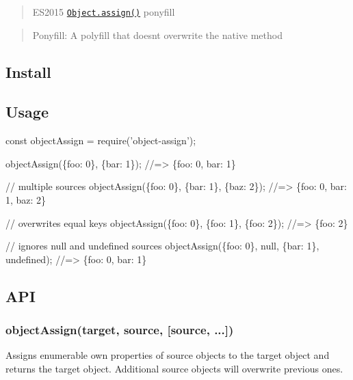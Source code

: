 \begin{quote}
E\+S2015 \href{http://www.2ality.com/2014/01/object-assign.html}{\tt {\ttfamily Object.\+assign()}} ponyfill \end{quote}


\begin{quote}
Ponyfill\+: A polyfill that doesn\textquotesingle{}t overwrite the native method \end{quote}


\subsection*{Install}




\subsection*{Usage}


\begin{DoxyCode}
const objectAssign = require('object-assign');

objectAssign(\{foo: 0\}, \{bar: 1\});
//=> \{foo: 0, bar: 1\}

// multiple sources
objectAssign(\{foo: 0\}, \{bar: 1\}, \{baz: 2\});
//=> \{foo: 0, bar: 1, baz: 2\}

// overwrites equal keys
objectAssign(\{foo: 0\}, \{foo: 1\}, \{foo: 2\});
//=> \{foo: 2\}

// ignores null and undefined sources
objectAssign(\{foo: 0\}, null, \{bar: 1\}, undefined);
//=> \{foo: 0, bar: 1\}
\end{DoxyCode}


\subsection*{A\+PI}

\subsubsection*{object\+Assign(target, source, \mbox{[}source, ...\mbox{]})}

Assigns enumerable own properties of {\ttfamily source} objects to the {\ttfamily target} object and returns the {\ttfamily target} object. Additional {\ttfamily source} objects will overwrite previous ones.


